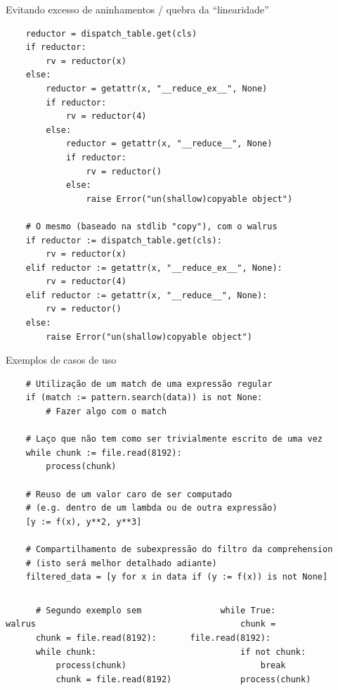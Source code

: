 \documentclass[utf8]{beamer}
\begin{document}
\begin{frame}[fragile]{Evitando excesso de aninhamentos /
                       quebra da ``linearidade''}
  \vspace{-1em}
  \begin{verbatim}
    reductor = dispatch_table.get(cls)
    if reductor:
        rv = reductor(x)
    else:
        reductor = getattr(x, "__reduce_ex__", None)
        if reductor:
            rv = reductor(4)
        else:
            reductor = getattr(x, "__reduce__", None)
            if reductor:
                rv = reductor()
            else:
                raise Error("un(shallow)copyable object")

    # O mesmo (baseado na stdlib "copy"), com o walrus
    if reductor := dispatch_table.get(cls):
        rv = reductor(x)
    elif reductor := getattr(x, "__reduce_ex__", None):
        rv = reductor(4)
    elif reductor := getattr(x, "__reduce__", None):
        rv = reductor()
    else:
        raise Error("un(shallow)copyable object")
  \end{verbatim}
\end{frame}


\begin{frame}[fragile]{Exemplos de casos de uso}
  \vspace{-1em}
  \begin{verbatim}
    # Utilização de um match de uma expressão regular
    if (match := pattern.search(data)) is not None:
        # Fazer algo com o match

    # Laço que não tem como ser trivialmente escrito de uma vez
    while chunk := file.read(8192):
        process(chunk)

    # Reuso de um valor caro de ser computado
    # (e.g. dentro de um lambda ou de outra expressão)
    [y := f(x), y**2, y**3]

    # Compartilhamento de subexpressão do filtro da comprehension
    # (isto será melhor detalhado adiante)
    filtered_data = [y for x in data if (y := f(x)) is not None]
  \end{verbatim}
  \vfill
  \vspace{-1em}
  \begin{columns}
    \begin{verbatim}
      # Segundo exemplo sem walrus
      chunk = file.read(8192):
      while chunk:
          process(chunk)
          chunk = file.read(8192)
    \end{verbatim}

    \begin{verbatim}
      while True:
          chunk = file.read(8192):
          if not chunk:
              break
          process(chunk)
    \end{verbatim}
  \end{columns}
\end{frame}
\end{document}
